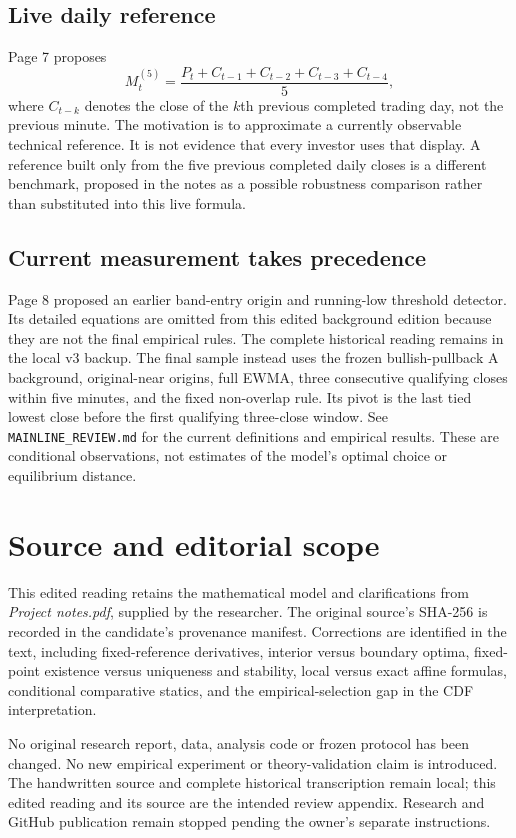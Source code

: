 \documentclass[11pt,a4paper]{article}
\begin{document}
\subsection{Live daily reference}
Page 7 proposes
\begin{equation}
 M_t^{(5)}=\frac{P_t+C_{t-1}+C_{t-2}+C_{t-3}+C_{t-4}}5,
\end{equation}
where $C_{t-k}$ denotes the close of the $k$th previous completed trading day,
not the previous minute. The motivation is to approximate a currently
observable technical reference. It is not evidence that every investor uses
that display. A reference built only from the five previous completed daily
closes is a different benchmark, proposed in the notes as a possible robustness
comparison rather than substituted into this live formula.

\subsection{Current measurement takes precedence}
Page 8 proposed an earlier band-entry origin and running-low threshold detector.
Its detailed equations are omitted from this edited background edition because
they are not the final empirical rules. The complete historical reading remains
in the local v3 backup. The final sample instead uses the frozen bullish-pullback
A background, original-near origins, full EWMA, three consecutive qualifying
closes within five minutes, and the fixed non-overlap rule. Its pivot is the last
tied lowest close before the first qualifying three-close window. See
\texttt{MAINLINE\_REVIEW.md} for the current definitions and empirical results.
These are conditional observations, not estimates of the model's optimal
choice or equilibrium distance.

\section*{Source and editorial scope}
This edited reading retains the mathematical model and clarifications from \emph{Project notes.pdf}, supplied by the researcher. The original
source's SHA-256 is recorded in the candidate's provenance manifest.
Corrections are identified in the text, including fixed-reference derivatives,
interior versus boundary optima, fixed-point existence versus uniqueness and
stability, local versus exact affine formulas, conditional comparative statics,
and the empirical-selection gap in the CDF interpretation.

No original research report, data, analysis code or frozen protocol has been
changed. No new empirical experiment or theory-validation claim is introduced.
The handwritten source and complete historical transcription remain local; this edited reading and its source are
the intended review appendix. Research and GitHub publication remain stopped
pending the owner's separate instructions.
\end{document}
